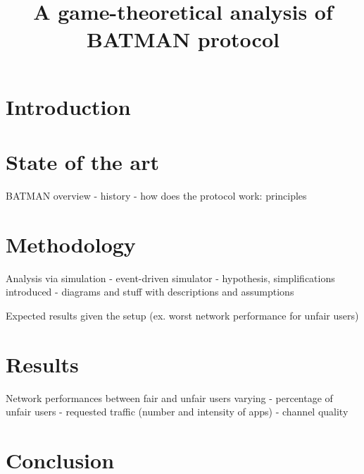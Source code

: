 \documentclass[conference]{IEEEtran}
\begin{document}
\title{A game-theoretical analysis of BATMAN protocol}

\author{
\and
{}
}

\maketitle

\begin{abstract}

\end{abstract}

\section{Introduction}

\section{State of the art}

BATMAN overview
- history
- how does the protocol work: principles

\section{Methodology}

Analysis via simulation
- event-driven simulator
- hypothesis, simplifications introduced
- diagrams and stuff with descriptions and assumptions

Expected results given the setup
(ex. worst network performance for unfair users)

\section{Results}

Network performances between fair and unfair users varying
- percentage of unfair users
- requested traffic (number and intensity of apps)
- channel quality

\section{Conclusion}



\end{document}
